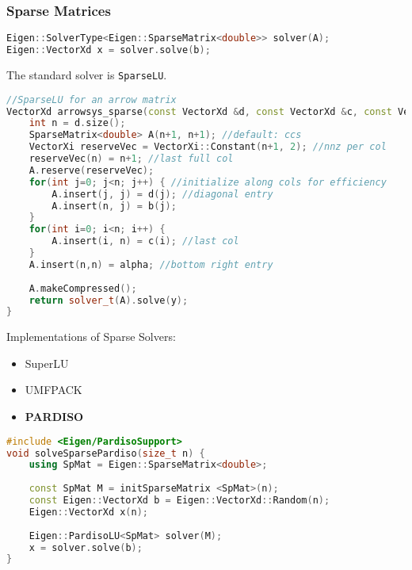 \documentclass[12pt]{article}
\begin{document}
\subsubsection{Sparse Matrices}
\begin{lstlisting}[language=c++]
Eigen::SolverType<Eigen::SparseMatrix<double>> solver(A);
Eigen::VectorXd x = solver.solve(b);
\end{lstlisting}
The standard solver is \texttt{SparseLU}.
\begin{lstlisting}[language=c++]
//SparseLU for an arrow matrix
VectorXd arrowsys_sparse(const VectorXd &d, const VectorXd &c, const VectorXd &b, const double alpha, const VectorXd &y) {
	int n = d.size();
	SparseMatrix<double> A(n+1, n+1); //default: ccs
	VectorXi reserveVec = VectorXi::Constant(n+1, 2); //nnz per col
	reserveVec(n) = n+1; //last full col
	A.reserve(reserveVec);
	for(int j=0; j<n; j++) { //initialize along cols for efficiency
		A.insert(j, j) = d(j); //diagonal entry
		A.insert(n, j) = b(j);
	}
	for(int i=0; i<n; i++) {
		A.insert(i, n) = c(i); //last col
	}
	A.insert(n,n) = alpha; //bottom right entry
	
	A.makeCompressed();
	return solver_t(A).solve(y);
}
\end{lstlisting}
Implementations of Sparse Solvers:
\begin{itemize}
\item SuperLU
\item UMFPACK
\item \textbf{PARDISO}
\end{itemize}
\begin{lstlisting}[language=c++]
#include <Eigen/PardisoSupport>
void solveSparsePardiso(size_t n) {
	using SpMat = Eigen::SparseMatrix<double>;
	
	const SpMat M = initSparseMatrix <SpMat>(n);
	const Eigen::VectorXd b = Eigen::VectorXd::Random(n);
	Eigen::VectorXd x(n);
	
	Eigen::PardisoLU<SpMat> solver(M);
	x = solver.solve(b);
}
\end{lstlisting}
\end{document}
